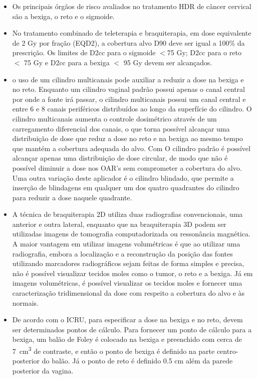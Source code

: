 \documentclass[11pt,a4paper]{article}
\newcounter{exemplo}
\begin{document}
\begin{exemplo}[8. Braquiterapia]
\begin{itemize}
        \item Os principais órgãos de risco avaliados no tratamento HDR de câncer cervical são a bexiga, o reto e o sigmoide.
        
        \item No tratamento combinado de teleterapia e braquiterapia, em dose equivalente de 2 Gy por fração (EQD2), a cobertura alvo D90 deve ser igual a 100\% da prescrição. Os limites de D2cc para o sigmoide $<$75 Gy; D2cc para o reto $<$ 75 Gy e D2cc para a bexiga $<$ 95 Gy devem ser alcançados.
        
        \item o uso de um cilindro multicanais pode auxiliar a reduzir a dose na bexiga e no reto. Enquanto um cilindro vaginal padrão possui apenas o canal central por onde a fonte irá passar, o cilindro multicanais possui um canal central e entre 6 e 8 canais periféricos distribuídos ao longo da superfície do cilindro. O cilindro multicanais aumenta o controle dosimétrico através de um carregamento diferencial dos canais, o que torna possível alcançar uma distribuição de dose que reduz a dose no reto e na bexiga ao mesmo tempo que mantém a cobertura adequada do alvo. Com O cilindro padrão é possível alcançar apenas uma distribuição de dose circular, de modo que não é possível diminuir a dose nos OAR's sem comprometer a cobertura do alvo. Uma outra variação deste aplicador  é o cilindro blindado, que permite a inserção de blindagens em qualquer um dos quatro quadrantes do cilindro para reduzir a dose naquele quadrante.
        
        \item A técnica de braquiterapia 2D utiliza duas radiografias convencionais, uma anterior e outra lateral, enquanto que na braquiterapia 3D podem ser utilizadas imagens de tomografia computadorizada ou ressonância magnética. A maior vantagem em utilizar imagens volumétricas é que ao utilizar uma radiografia, embora a localização e a reconstrução da posição das fontes utilizando marcadores radiográficos sejam feitas de forma simples e precisa, não é possível visualizar tecidos moles como o tumor, o reto e a bexiga. Já em imagens volumétricas, é possível visualizar os tecidos moles e fornecer uma caracterização tridimensional da dose com respeito a cobertura do alvo e às normais.
        
        \item De acordo com o ICRU, para especificar a dose na bexiga e no reto, devem ser determinados pontos de cálculo. Para fornecer um ponto de cálculo para a bexiga, um balão de Foley é colocado na bexiga e preenchido com cerca de \qty{7}{cm^3} de contraste, e então o ponto de bexiga é definido na parte centro-posterior do balão. Já o ponto de reto é definido 0.5 cm além da parede posterior da vagina.
        

\end{itemize}
\end{exemplo}
\end{document}
